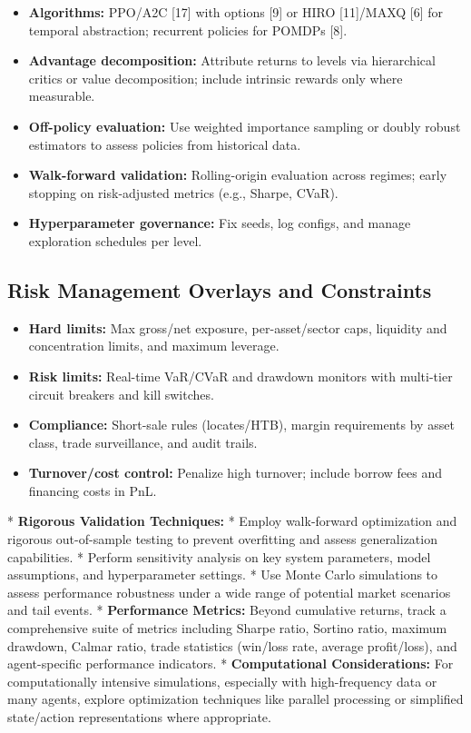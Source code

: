 \documentclass[11pt]{article}
\begin{document}
\begin{itemize}
\item   \textbf{Algorithms:} PPO/A2C [17] with options [9] or HIRO [11]/MAXQ [6] for temporal abstraction; recurrent policies for POMDPs [8].
\item   \textbf{Advantage decomposition:} Attribute returns to levels via hierarchical critics or value decomposition; include intrinsic rewards only where measurable.
\item   \textbf{Off-policy evaluation:} Use weighted importance sampling or doubly robust estimators to assess policies from historical data.
\item   \textbf{Walk-forward validation:} Rolling-origin evaluation across regimes; early stopping on risk-adjusted metrics (e.g., Sharpe, CVaR).
\item   \textbf{Hyperparameter governance:} Fix seeds, log configs, and manage exploration schedules per level.

\end{itemize}
\subsection{Risk Management Overlays and Constraints}

\begin{itemize}
\item   \textbf{Hard limits:} Max gross/net exposure, per-asset/sector caps, liquidity and concentration limits, and maximum leverage.
\item   \textbf{Risk limits:} Real-time VaR/CVaR and drawdown monitors with multi-tier circuit breakers and kill switches.
\item   \textbf{Compliance:} Short-sale rules (locates/HTB), margin requirements by asset class, trade surveillance, and audit trails.
\item   \textbf{Turnover/cost control:} Penalize high turnover; include borrow fees and financing costs in PnL.
\end{itemize}
    *   \textbf{Rigorous Validation Techniques:}
        *   Employ walk-forward optimization and rigorous out-of-sample testing to prevent overfitting and assess generalization capabilities.
        *   Perform sensitivity analysis on key system parameters, model assumptions, and hyperparameter settings.
        *   Use Monte Carlo simulations to assess performance robustness under a wide range of potential market scenarios and tail events.
    *   \textbf{Performance Metrics:} Beyond cumulative returns, track a comprehensive suite of metrics including Sharpe ratio, Sortino ratio, maximum drawdown, Calmar ratio, trade statistics (win/loss rate, average profit/loss), and agent-specific performance indicators.
    *   \textbf{Computational Considerations:} For computationally intensive simulations, especially with high-frequency data or many agents, explore optimization techniques like parallel processing or simplified state/action representations where appropriate.
\end{document}
